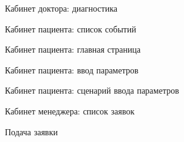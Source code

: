 \newpage \begin{figure}[h]
\caption{Кабинет доктора: диагностика}
\label{app:doctor_cabinet_diagnostic}
\end{figure}

\newpage \begin{figure}[h]
\caption{Кабинет пациента: список событий}
\label{app:patient_cabinet_events}
\end{figure}

\newpage \begin{figure}[h]
\caption{Кабинет пациента: главная страница}
\label{app:patient_cabinet_main}
\end{figure}

\newpage \begin{figure}[h]
\caption{Кабинет пациента: ввод параметров}
\label{app:patient_cabinet_parameters}
\end{figure}

\newpage \begin{figure}[h]
\caption{Кабинет пациента: сценарий ввода параметров}
\label{app:enter_parameter}
\end{figure}

\newpage \begin{figure}[h]
\caption{Кабинет менеджера: список заявок}
\label{app:manager_cabinet_bid}
\end{figure}

\newpage \begin{figure}[h]
\caption{Подача заявки}
\label{app:bid_form}
\end{figure}

